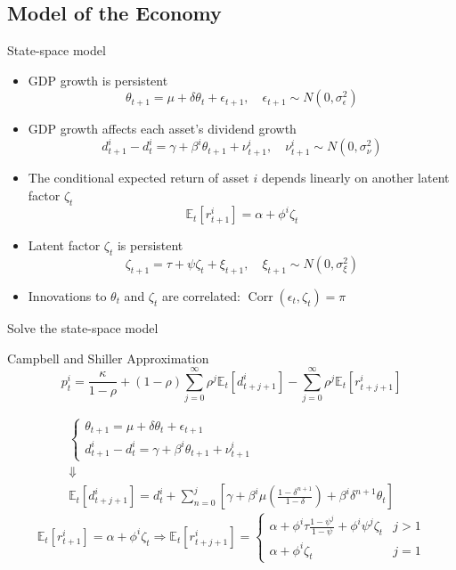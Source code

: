 \documentclass[UTF8, 16pt]{beamer}
\begin{document}
\begin{CJK*}{UTF8}{gbsn}
\subsection{Model of the Economy}
\begin{frame}{State-space model}
	\begin{itemize}
		\item GDP growth is persistent 
			$$\theta_{t+1}  =\mu+\delta \theta_{t}+\epsilon_{t+1}, \quad \epsilon_{t+1} \sim N\left(0, \sigma_{\epsilon}^{2}\right)$$
		\item GDP growth affects each asset’s dividend growth
			$$d_{t+1}^{i}-d_{t}^{i}  =\gamma+\beta^{i} \theta_{t+1}+\nu_{t+1}^{i}, \quad \nu_{t+1}^{i} \sim N\left(0, \sigma_{\nu}^{2}\right)$$
		\item The conditional expected return of asset $i$ depends linearly on another latent factor $\zeta_{t}$
			$$\mathbb{E}_{t}\left[r_{t+1}^{i}\right]  =\alpha+\phi^{i} \zeta_{t}$$
		\item Latent factor $\zeta_{t}$ is persistent
			$$\zeta_{t+1}  =\tau+\psi \zeta_{t}+\xi_{t+1}, \quad \xi_{t+1} \sim N\left(0, \sigma_{\xi}^{2}\right)$$
		\item Innovations to $\theta_t$ and $\zeta_t$ are correlated:  $\operatorname{Corr}\left(\epsilon_{t}, \zeta_t\right)=\pi$
	\end{itemize}
\end{frame}
\begin{frame}{Solve the state-space model}
	\begin{alertblock}{Campbell and Shiller Approximation}
	$$
	p_{t}^{i} =\frac{\kappa}{1-\rho}+(1-\rho) \sum_{j=0}^{\infty} \rho^{j} \mathbb{E}_{t}\left[d_{t+j+1}^{i}\right]-\sum_{j=0}^{\infty} \rho^{j} \mathbb{E}_{t}\left[r_{t+j+1}^{i}\right]
	$$
	\end{alertblock}
	$$
	\begin{array}{c}
		\begin{cases}
			\theta_{t+1}  =\mu+\delta \theta_{t}+\epsilon_{t+1}
			\\
			d_{t+1}^{i}-d_{t}^{i}  =\gamma+\beta^{i} \theta_{t+1}+\nu_{t+1}^{i}
		\end{cases}
		\\
		\Downarrow
		\\
		\mathbb{E}_{t}\left[d_{t+j+1}^{i}\right]=d_{t}^{i}+\sum_{n=0}^{j}{\left[\gamma+\beta^{i} \mu\left(\frac{1-\delta^{n+1}}{1-\delta}\right)+\beta^{i} \delta^{n+1} \theta_{t}\right]}
	\end{array}
	$$
	$$\mathbb{E}_{t}\left[r_{t+1}^{i}\right]  =\alpha+\phi^{i} \zeta_{t} \Rightarrow \mathbb{E}_{t}\left[r_{t+j+1}^{i}\right]=\left\{\begin{array}{ll}\alpha+\phi^{i} \tau \frac{1-\psi^{j}}{1-\psi}+\phi^{i} \psi^{j} \zeta_{t} & j>1 \\ \alpha+\phi^{i} \zeta_{t} & j=1\end{array}\right.$$

\end{frame}
\end{CJK*}
\end{document}
